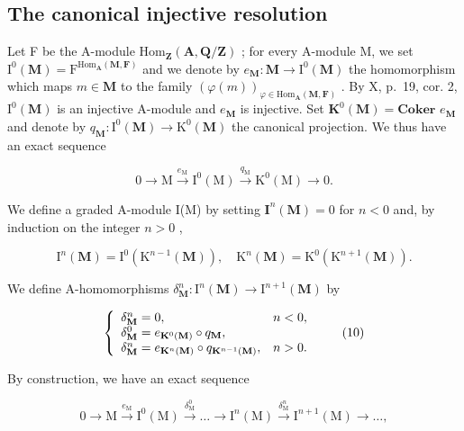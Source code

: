 \subsection{The canonical injective resolution}

Let F be the A-module \(\mathrm{Hom}_{\mathbf{Z}}(\mathbf{A},\mathbf{Q} / \mathbf{Z})\) ; for every A-module M, we set \(\mathrm{I}^0 (\mathbf{M}) = \mathrm{F}^{\mathrm{Hom}_{\mathbf{A}}(\mathbf{M},\mathbf{F})}\) and we denote by \(e_{\mathbf{M}}:\mathbf{M}\to \mathrm{I}^{0}(\mathbf{M})\) the homomorphism which maps \(m\in \mathbf{M}\) to the family \((\varphi (m))_{\varphi \in \mathrm{Hom}_{\mathbf{A}}(\mathbf{M},\mathbf{F})}\) . By X, p.~19, cor. 2, \(\mathrm{I}^0 (\mathbf{M})\) is an injective A-module and \(e_{\mathbf{M}}\) is injective. Set \(\mathbf{K}^0 (\mathbf{M}) = \mathbf{Coker}\) \(e_{\mathbf{M}}\) and denote by \(q_{\mathbf{M}}:\mathrm{I}^0 (\mathbf{M})\to \mathrm{K}^0 (\mathbf{M})\) the canonical projection. We thus have an exact sequence

\[
0 \longrightarrow \mathrm{M} \stackrel {e _ {\mathrm{M}}} {\longrightarrow} \mathrm{I} ^ {0} (\mathrm{M}) \stackrel {q _ {\mathrm{M}}} {\longrightarrow} \mathrm{K} ^ {0} (\mathrm{M}) \longrightarrow 0.
\]

We define a graded A-module I(M) by setting \(\mathbf{I}^n (\mathbf{M}) = 0\) for \(n < 0\) and, by induction on the integer \(n > 0\) ,

\[
\mathrm{I} ^ {n} (\mathbf {M}) = \mathrm{I} ^ {0} \left(\mathrm{K} ^ {n - 1} (\mathbf {M})\right), \quad \mathrm{K} ^ {n} (\mathbf {M}) = \mathrm{K} ^ {0} \left(\mathrm{K} ^ {n + 1} (\mathbf {M})\right).\tag{9}
\]

We define A-homomorphisms \(\delta_{\mathbf{M}}^{n}:\mathrm{I}^{n}(\mathbf{M})\to \mathrm{I}^{n + 1}(\mathbf{M})\) by

\[
\left\{ \begin{array}{l l} \delta_ {\mathbf {M}} ^ {n} = 0, & n <   0, \\ \delta_ {\mathbf {M}} ^ {0} = e _ {\mathbf {K} ^ {0} (\mathbf {M})} \circ q _ {\mathbf {M}}, \\ \delta_ {\mathbf {M}} ^ {n} = e _ {\mathbf {K} ^ {n} (\mathbf {M})} \circ q _ {\mathbf {K} ^ {n - 1} (\mathbf {M})}, & n > 0. \end{array} \right.\tag{10}
\]

By construction, we have an exact sequence

\[
0 \longrightarrow \mathrm{M} \xrightarrow {e _ {\mathrm{M}}} \mathrm{I} ^ {0} (\mathrm{M}) \xrightarrow {\delta_ {\mathrm{M}} ^ {0}} \dots \longrightarrow \mathrm{I} ^ {n} (\mathrm{M}) \xrightarrow {\delta_ {\mathrm{M}} ^ {n}} \mathrm{I} ^ {n + 1} (\mathrm{M}) \longrightarrow \dots ,
\]


